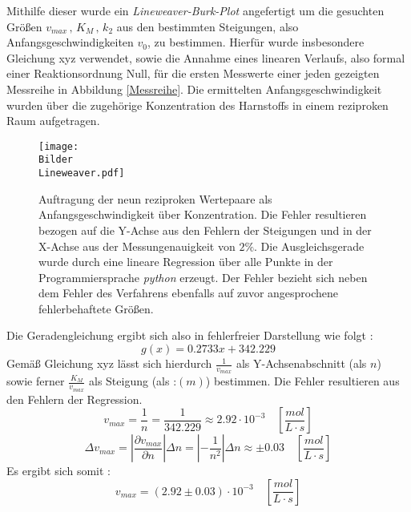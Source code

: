 Mithilfe dieser wurde ein \textit{Lineweaver-Burk-Plot} angefertigt um die gesuchten Größen $v_{max}\, , \, K_M\, ,\, k_2$ aus den bestimmten Steigungen, also Anfangsgeschwindigkeiten $v_0$, zu bestimmen. Hierfür wurde insbesondere Gleichung xyz verwendet, sowie die Annahme eines linearen Verlaufs, also formal einer Reaktionsordnung Null, für die ersten Messwerte einer jeden gezeigten Messreihe in Abbildung \ref{Messreihe}. Die ermittelten Anfangsgeschwindigkeit wurden über die zugehörige Konzentration des Harnstoffs in einem reziproken Raum aufgetragen.
\begin{figure}[H]
	\centering	
	\begin{minipage}{1\textwidth}
		\texttt{[image: \\Bilder\\Lineweaver.pdf]}
	\end{minipage}
	\caption{Auftragung der neun reziproken Wertepaare als Anfangsgeschwindigkeit über Konzentration. Die Fehler resultieren bezogen auf die Y-Achse aus den Fehlern der Steigungen und in der X-Achse aus der Messungenauigkeit von $2\%$. Die Ausgleichsgerade wurde durch eine lineare Regression über alle Punkte in der Programmiersprache \textit{python} erzeugt. Der Fehler bezieht sich neben dem Fehler des Verfahrens ebenfalls auf zuvor angesprochene fehlerbehaftete Größen.}
	\label{Lineweaver}
\end{figure}
Die Geradengleichung ergibt sich also in fehlerfreier Darstellung wie folgt : 
\begin{equation}
g(x) = 0.2733 x + 342.229
\label{Geradengleichung}
\end{equation}
Gemäß Gleichung xyz lässt sich hierdurch $\frac{1}{v_{max}}$ als Y-Achsenabschnitt (als $n$) sowie ferner $\frac{K_M}{v_{max}}$ als Steigung (als :$(m)$) bestimmen. Die Fehler resultieren aus den Fehlern der Regression.\\
\begin{equation}
v_{max} = \frac{1}{n} = \frac{1}{342.229} \approx 2.92\cdot 10^{-3} \quad \left[\si{\frac{mol}{L\cdot s}}\right]
\end{equation}
\begin{equation}
\Delta v_{max} = |\frac{\partial v_{max}}{\partial n}|\Delta n = |-\frac{1}{n^2}|\Delta n \approx \pm 0.03  \quad \left[\si{\frac{mol}{L\cdot s}}\right]
\end{equation}
Es ergibt sich somit : 
\begin{equation}
v_{max} = (2.92 \pm 0.03 )\cdot 10^{-3}  \quad \left[\si{\frac{mol}{L\cdot s}}\right]
\end{equation}\\
